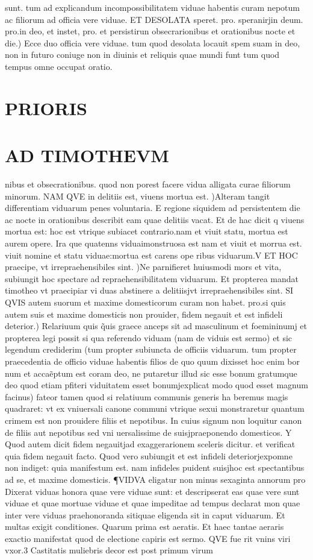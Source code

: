 \documentclass{article}
\begin{document}
\begin{pages}
sunt. tum ad explicandum incompossibilitatem viduae habentis curam nepotum ac filiorum ad officia vere viduae. ET DESOLATA speret. pro. speranirjin deum. pro.in deo, et instet, pro. et persistirun obsecrarionibus et orationibus nocte et die.) Ecce duo officia vere viduae. tum quod desolata locauit spem suam in deo, non in futuro coniuge non in diuinis et reliquis quae mundi funt tum quod tempus omne occupat oratio.  \pend
\section*{PRIORIS }
\section*{AD TIMOTHEVM }\pstart nibus et obsecrationibus. quod non porest facere vidua alligata curae filiorum minorum. NAM QVE in delitiis est, viuens mortua est. )Alteram tangit differentiam viduarum penes voluntaria. E regione siquidem ad persistentem die ac nocte in orationibus describit eam quae delitiis vacat. Et de hac dicit q viuens mortua est: hoc est vtrique subiacet contrario.nam et viuit statu, mortua est aurem opere. Ira que quatenns viduaimonstruosa est nam et viuit et morrua est. viuit nomine et statu viduae:mortua est carens ope ribus viduarum.V ET HOC praecipe, vt irrepraehensibiles sint. )Ne parnifieret huiusmodi mors et vita, subiungit hoc spectare ad repraehensibilitatem viduarum. Et propterea mandat timotheo vt praecipiar vi duas abstinere a delitiisjvt irrepraehensibiles sint. SI QVIS autem suorum et maxime domesticorum curam non habet. pro.si quis autem suis et maxime domesticis non prouider, fidem negauit et est infideli deterior.) Relariuum quis q̃uis graece anceps sit ad masculinum et foemininumj et propterea legi possit si qua referendo viduam (nam de viduis est sermo) et sic legendum crediderim (tum propter subiuncta de officiis viduarum. tum propter praecedentia de officio viduae habentis filios de quo quum dixisset hoc enim bor num et accaẽptum est coram deo, ne putaretur illud sic esse bonum gratumque deo quod etiam pfiteri viduitatem esset bonumjexplicat modo quod esset magnum facinus) fateor tamen quod si relatiuum communis generis ha beremus magis quadraret: vt ex vniuersali canone communi vtrique sexui monstraretur quantum crimem est non prouidere filiis et nepotibus. In cuius signum non loquitur canon de filiis aut nepotibus sed vni uersalissime de suisjpraeponendo domesticos. Y Quod autem dicit fidem negauitjad exaggerarionem sceleris dicitur. et verificat quia fidem negauit facto. Quod vero subiungit et est infideli deteriorjexpomne non indiget: quia manifestum est. nam infideles puident suisjhoc est spectantibus ad se, et maxime domesticis. ¶VIDVA eligatur non minus sexaginta annorum pro Dixerat viduas honora quae vere viduae sunt: et descripserat eas quae vere sunt viduae et quae mortuae viduae et quae impeditae ad tempus declarat mon quae inter vere viduas praehonoranda sitiquae eligenda sit in caput viduarum. Et multas exigit conditiones. Quarum prima est aeratis. Et haec tantae aeraris exactio manifestat quod de electione capiris est sermo. QVE fue rit vnins viri vxor.3 Castitatis muliebris decor est post primum virum 
\end{pages}
\end{document}
